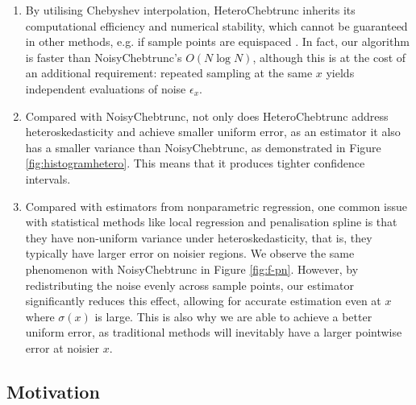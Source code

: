 \documentclass[pdflatex,sn-mathphys-num]{sn-jnl}%
\theoremstyle{thmstyleone}%
\theoremstyle{thmstyletwo}%
\theoremstyle{thmstylethree}%
\begin{document}
\begin{enumerate}
	\item By utilising Chebyshev interpolation, HeteroChebtrunc inherits its computational efficiency and numerical stability, which cannot be guaranteed in other methods, e.g. if sample points are equispaced \cite{yuji}. In fact, our algorithm is faster than NoisyChebtrunc's $O(N\log N)$, although this is at the cost of an additional requirement: repeated sampling at the same $x$ yields independent evaluations of noise $\epsilon_x$.
	\item Compared with NoisyChebtrunc, not only does HeteroChebtrunc address heteroskedasticity and achieve smaller uniform error, as an estimator it also has a smaller variance than NoisyChebtrunc, as demonstrated in Figure \ref{fig:histogramhetero}. This means that it produces tighter confidence intervals.
	\item Compared with estimators from nonparametric regression, one common issue with statistical methods like local regression and penalisation spline is that they have non-uniform variance under heteroskedasticity, that is, they typically have larger error on noisier regions. We observe the same phenomenon with NoisyChebtrunc in Figure \ref{fig:f-pn}. However, by redistributing the noise evenly across sample points, our estimator significantly reduces this effect, allowing for accurate estimation even at $x$ where $\sigma(x)$ is large. This is also why we are able to achieve a better uniform error, as traditional methods will inevitably have a larger pointwise error at noisier $x$.
\end{enumerate}

\subsection{Motivation}
\end{document}
